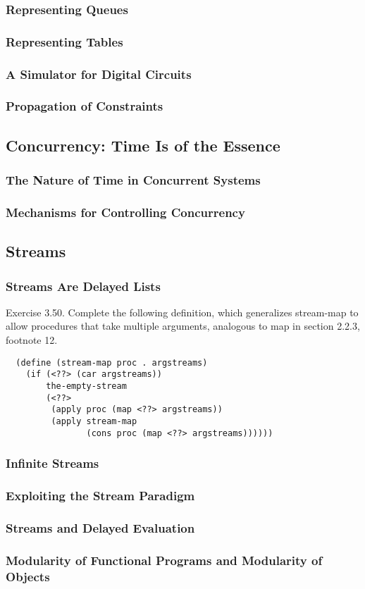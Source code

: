             \subsubsection{Representing Queues}
            \subsubsection{Representing Tables}
            \subsubsection{A Simulator for Digital Circuits}
            \subsubsection{Propagation of Constraints}
        \subsection{Concurrency: Time Is of the Essence}
            \subsubsection{The Nature of Time in Concurrent Systems}
            \subsubsection{Mechanisms for Controlling Concurrency}
        \subsection{Streams}
            \subsubsection{Streams Are Delayed Lists}
Exercise 3.50.  Complete the following definition, which generalizes stream-map to allow procedures that take multiple arguments, analogous to map in section 2.2.3, footnote 12.
\begin{verbatim}
  (define (stream-map proc . argstreams)
    (if (<??> (car argstreams))
        the-empty-stream
        (<??>
         (apply proc (map <??> argstreams))
         (apply stream-map
                (cons proc (map <??> argstreams))))))
\end{verbatim}
            \subsubsection{Infinite Streams}
            \subsubsection{Exploiting the Stream Paradigm}
            \subsubsection{Streams and Delayed Evaluation}
            \subsubsection{Modularity of Functional Programs and Modularity of Objects}


